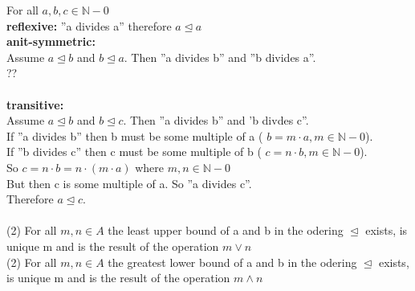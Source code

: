 \documentclass[11pt,leqno,fleqn]{article}
\begin{document}
For all $ a,b,c \in \mathbb{N}-{0}$\\
 \textbf{reflexive:}  ''a divides a'' therefore $  a \trianglelefteq a $\\
 \textbf{anit-symmetric:} \\
Assume  $a \trianglelefteq b$ and $b \trianglelefteq a$. Then ''a divides b'' and ''b divides a''. \\
??\\
  \\
\textbf{transitive:}\\
Assume $a \trianglelefteq b$ and $b \trianglelefteq c$. Then ''a divides b'' and 'b divdes c''.  \\
If ''a divides b'' then b must be some multiple of a ( $ b = m \cdot  a, m \in \mathbb{N}-{0}$).\\ 
If ''b divides c'' then c must be some multiple of b ( $ c = n \cdot  b, m \in \mathbb{N}-{0}$).\\ 
So $c = n \cdot b = n \cdot (m \cdot a) $ where $m,n \in \mathbb{N}-{0}$\\
But then c is some multiple of a. So ''a divides c''.\\
Therefore $ a \trianglelefteq c$.\\
\\
(2) For all $m,n \in A$ the least upper bound of a and b in the odering $\trianglelefteq$ exists, is unique m and is the result of the operation $m \lor n$\\
(2) For all $m,n \in A$ the greatest lower bound of a and b in the odering $\trianglelefteq$ exists, is unique m and is the result of the operation $m \land n$\\
\end{document}
